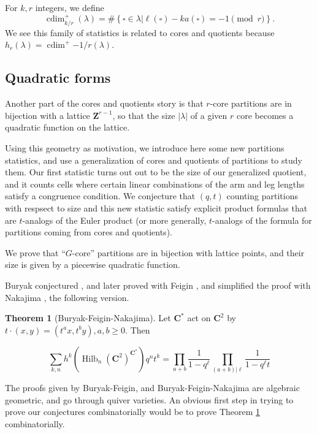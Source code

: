 \documentclass{amsart}[12pt]
\theoremstyle{definition}
\newtheorem{theorem}[dummy]{Theorem}
\newcommand{\Z}{\mathbf{Z}}
\newcommand{\C}{\mathbf{C}}
\DeclareMathOperator{\Hilb}{Hilb}
\DeclareMathOperator{\cdim}{cdim}
\begin{document}
For $k, r$ integers, we define
\[\cdim^+_{k/r}(\lambda)=\#\left\{\square\in\lambda \Big | \ell(\square)-k a(\square)=-1 \pmod r\right\}. \]
We see this family of statistics is related to cores and quotients because $h_r(\lambda)=\cdim^+{-1/r}(\lambda)$.


\subsection{Quadratic forms}
Another part of the cores and quotients story is that $r$-core partitions are in bijection with a lattice $\Z^{r-1}$, so that the size $|\lambda|$ of a given $r$ core becomes a quadratic function on the lattice.




Using this geometry as motivation, we introduce here some new partitions statistics, and use a generalization of cores and quotients of partitions to study them.  Our first statistic turns out out to be the size of our generalized quotient, and it counts cells where certain linear combinations of the arm and leg lengths satisfy a congruence condition.  We conjecture that $(q,t)$ counting partitions with respsect to size and this new statistic satisfy explicit product formulas that are $t$-analogs of the Euler product (or more generally, $t$-analogs of the formula for partitions coming from cores and quotients).  



We prove that ``$G$-core'' partitions are in bijection with lattice points, and their size is given by a piecewise quadratic function.  




Buryak conjectured \cite{Buryak}, and later proved with Feigin \cite{BF}, and simplified the proof with Nakajima \cite{BFN}, the following version. 

\begin{theorem}[Buryak-Feigin-Nakajima] \label{thm:BFN}
Let $\C^*$ act on $\C^2$ by $t\cdot (x,y)=(t^ax, t^by), a,b\geq 0$.  Then

$$\sum_{k,n} h^k(\Hilb_n(\C^2)^{\C^*})q^nt^k=\prod_{a+b } \frac{1}{1-q^\ell}\prod_{(a+b)|\ell} \frac{1}{1-q^\ell t}$$
\end{theorem}

The proofs given by Buryak-Feigin, and Buryak-Feigin-Nakajima are algebraic geometric, and go through quiver varieties.  An obvious first step in trying to prove our conjectures combinatorially would be to prove Theorem \ref{thm:BFN} combinatorially.  
\end{document}
